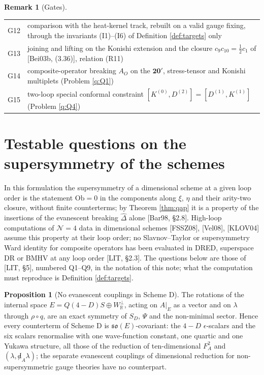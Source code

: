 \documentclass[11pt]{article}
\theoremstyle{definition}
\newtheorem{proposition}[definition]{Proposition}
\newtheorem{remark}[definition]{Remark}
\numberwithin{equation}{section}
\begin{document}
\begin{remark}[Gates]
{\begin{tabular}{p{}|p{}}
G12 & comparison with the heat-kernel track, rebuilt on a valid gauge fixing, through the invariants (I1)--(I6) of Definition \ref{def:targets} only\\
G13 & joining and lifting on the Konishi extension and the closure $c_9c_{10}=\frac12c_1$ of [Bei03b, (3.36)], relation (R11)\\
G14 & composite-operator breaking $A_O$ on the $\mathbf{20}'$, stress-tensor and Konishi multiplets (Problem \ref{q:Q1})\\
G15 & two-loop special conformal constraint $[K^{(0)},D^{(2)}]=[D^{(1)},K^{(1)}]$ (Problem \ref{q:Q4})\\
\end{tabular}}\par\smallskip
\end{remark}

\section{Testable questions on the supersymmetry of the schemes}
\label{sec:questions}

In this formulation the supersymmetry of a dimensional scheme at a given loop order is the statement $\mathrm{Ob}=0$ in the components along $\xi$, $\eta$ and their arity-two closure, without finite counterterms; by Theorem \ref{thm:qap} it is a property of the insertions of the evanescent breaking $\widehat\Delta$ alone [Bar98, §2.8]. High-loop computations of $\mathcal N=4$ data in dimensional schemes [FSSZ08], [Vel08], [KLOV04] assume this property at their loop order; no Slavnov--Taylor or supersymmetry Ward identity for composite operators has been evaluated in DRED, superspace DR or BMHV at any loop order [LIT, §2.3]. The questions below are those of [LIT, §5], numbered Q1--Q9, in the notation of this note; what the computation must reproduce is Definition \ref{def:targets}.

\begin{proposition}[No evanescent couplings in Scheme D]
\label{prop:noevcoup}
The rotations of the internal space $E=Q(4{-}D)S\oplus W^\perp_{\mathbb R}$, acting on $A|_E$ as a vector and on $\lambda$ through $\rho\circ q$, are an exact symmetry of $S_D$, $\Psi$ and the non-minimal sector. Hence every counterterm of Scheme D is $\mathfrak{so}(E)$-covariant: the $4-D$ $\epsilon$-scalars and the six scalars renormalise with one wave-function constant, one quartic and one Yukawa structure, all those of the reduction of ten-dimensional $F_A^2$ and $(\lambda,{\not d}_A\lambda)$; the separate evanescent couplings of dimensional reduction for non-supersymmetric gauge theories have no counterpart.
\end{proposition}
\end{document}
